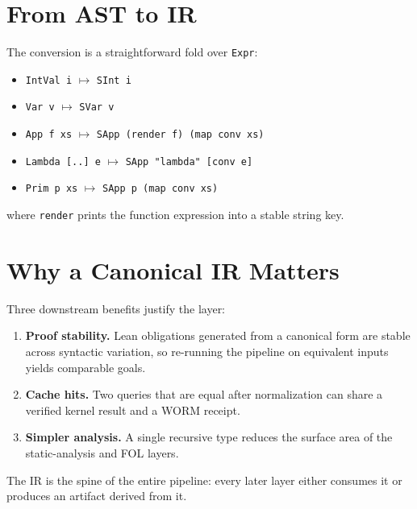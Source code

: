 \section{From AST to IR}
\label{sec:ir-conv}

The conversion is a straightforward fold over \texttt{Expr}:
\begin{itemize}
  \item \texttt{IntVal i} $\mapsto$ \texttt{SInt i}
  \item \texttt{Var v} $\mapsto$ \texttt{SVar v}
  \item \texttt{App f xs} $\mapsto$ \texttt{SApp (render f) (map conv xs)}
  \item \texttt{Lambda [..] e} $\mapsto$ \texttt{SApp "lambda" [conv e]}
  \item \texttt{Prim p xs} $\mapsto$ \texttt{SApp p (map conv xs)}
\end{itemize}
where \texttt{render} prints the function expression into a stable string key.

\section{Why a Canonical IR Matters}
\label{sec:ir-why}

Three downstream benefits justify the layer:
\begin{enumerate}
  \item \textbf{Proof stability.} Lean obligations generated from a canonical
        form are stable across syntactic variation, so re-running the pipeline
        on equivalent inputs yields comparable goals.
  \item \textbf{Cache hits.} Two queries that are equal after normalization
        can share a verified kernel result and a WORM receipt.
  \item \textbf{Simpler analysis.} A single recursive type reduces the
        surface area of the static-analysis and FOL layers.
\end{enumerate}
The IR is the spine of the entire pipeline: every later layer either consumes
it or produces an artifact derived from it.
